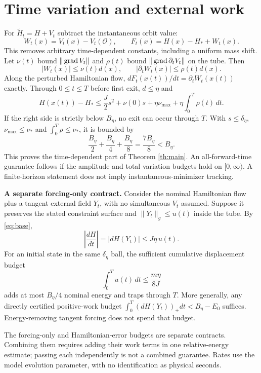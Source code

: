 \documentclass[11pt,a4paper]{article}
\begin{document}
\section{Time variation and external work}
For $\widetilde H_t=H+V_t$ subtract the instantaneous orbit value:
\[
W_t(x)=V_t(x)-V_t(\mathcal O),\qquad
F_t(x)=H(x)-H_*+W_t(x).
\]
This removes arbitrary time-dependent constants, including a uniform mass shift. Let $\nu(t)$ bound $\|\operatorname{grad} V_t\|$ and $\rho(t)$ bound $\|\operatorname{grad}\partial_tV_t\|$ on the tube. Then
\[
|W_t(x)|\le\nu(t)d(x),\qquad
|\partial_tW_t(x)|\le\rho(t)d(x).
\]
Along the perturbed Hamiltonian flow, $dF_t(x(t))/dt=\partial_tW_t(x(t))$ exactly. Through $0\le t\le T$ before first exit, $d\le\eta$ and
\begin{equation}\label{eq:time}
H(x(t))-H_*\le\frac J2s^2+\nu(0)s+
\eta\nu_{\max}+\eta\int_0^T\rho(t)\,dt.
\end{equation}
If the right side is strictly below $B_\eta$, no exit can occur through $T$. With $s\le\delta_\eta$, $\nu_{\max}\le\nu_*$ and $\int_0^T\rho\le\nu_*$, it is bounded by
\[
\frac{B_\eta}{2}+\frac{B_\eta}{4}+\frac{B_\eta}{8}
=\frac{7B_\eta}{8}<B_\eta.
\]
This proves the time-dependent part of Theorem \ref{th:main}. An all-forward-time guarantee follows if the amplitude and total variation budgets hold on $[0,\infty)$. A finite-horizon statement does not imply instantaneous-minimizer tracking.

\textbf{A separate forcing-only contract.} Consider the nominal Hamiltonian flow plus a tangent external field $Y_t$, with no simultaneous $V_t$ assumed. Suppose it preserves the stated constraint surface and $\|Y_t\|_g\le u(t)$ inside the tube. By \eqref{eq:base},
\[
\left|\frac{dH}{dt}\right|=|dH(Y_t)|\le J\eta\,u(t).
\]
For an initial state in the same $\delta_\eta$ ball, the sufficient cumulative displacement budget
\[
\boxed{\int_0^T u(t)\,dt\le\frac{m\eta}{8J}}
\]
adds at most $B_\eta/4$ nominal energy and traps through $T$. More generally, any directly certified positive-work budget $\int_0^T(dH(Y_t))_+dt<B_\eta-E_0$ suffices. Energy-removing tangent forcing does not spend that budget.

The forcing-only and Hamiltonian-error budgets are separate contracts. Combining them requires adding their work terms in one relative-energy estimate; passing each independently is not a combined guarantee. Rates use the model evolution parameter, with no identification as physical seconds.
\newpage
\end{document}
